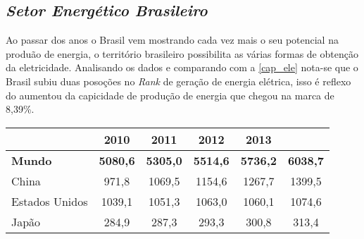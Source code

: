 \subsection[\textit{Setor Energético Brasileiro}]{\textit{Setor Energético Brasileiro}}\label{seb}
Ao passar dos anos o Brasil vem mostrando cada vez mais o seu potencial na produão de energia, o território brasileiro possibilita as várias formas
de obtenção da eletricidade. Analisando os dados \cite[p.29]{epe-anuario-2015} e comparando com a \autoref{cap_ele} nota-se que o Brasil subiu duas
posoções no \textit{Rank} de geração de energia elétrica, isso é reflexo do aumentou da capicidade de produção de energia que chegou na marca de 8,39\%.

\begin{table}[!ht]
	\centering
	\begin{tabular}{lccccc}
		\rowcolor[HTML]{9B9B9B} 
		\multicolumn{1}{c}{\cellcolor[HTML]{9B9B9B}} & {\color[HTML]{FFFFFF} \textbf{2010}} & {\color[HTML]{FFFFFF} \textbf{2011}} & {\color[HTML]{FFFFFF} \textbf{2012}} & {\color[HTML]{FFFFFF} \textbf{2013}} & \multicolumn{1}{l}{\cellcolor[HTML]{9B9B9B}{\color[HTML]{FFFFFF} \textbf{2014}}} \\ \hline
		\textbf{Mundo}                               & \multicolumn{1}{l}{\textbf{5080,6}}  & \multicolumn{1}{l}{\textbf{5305,0}}  & \multicolumn{1}{l}{\textbf{5514,6}}  & \multicolumn{1}{l}{\textbf{5736,2}}  & \multicolumn{1}{l}{\textbf{6038,7}}                                              \\ \hline
		\rowcolor[HTML]{DDDDDD} 
		China                                        & 971,8                                & 1069,5                               & 1154,6                               & 1267,7                               & 1399,5                                                                           \\
		Estados Unidos                               & 1039,1                               & 1051,3                               & 1063,0                               & 1060,1                               & 1074,6                                                                           \\
		\rowcolor[HTML]{DDDDDD} 
		Japão                                        & 284,9                                & 287,3                                & 293,3                                & 300,8                                & 313,4                                                                            \\

\end{tabular}
\end{table}
